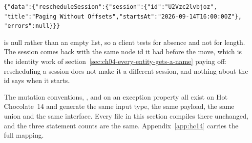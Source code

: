 \begin{verbatim}
{"data":{"rescheduleSession":{"session":{"id":"U2Vzc2lvbjoz",
"title":"Paging Without Offsets","startsAt":"2026-09-14T16:00:00Z"},
"errors":null}}}
\end{verbatim}

 is null rather than an empty list, so a client tests for absence
and not for length. The session comes back with the same node id it had before
the move, which is the identity work of
section~\ref{sec:ch04-every-entity-gets-a-name} paying off: rescheduling a
session does not make it a different session, and nothing about the id says
when it starts.

\begin{onhc14}
The mutation conventions, \code{[MutationType]}, \code{[Error<T>]} and
\code{[ID<T>]} on an exception property all exist on Hot Chocolate~14 and
generate the same input type, the same payload, the same union and the same
 interface. Every file in this section compiles there unchanged,
and the three statement counts are the same.
Appendix~\ref{app:hc14} carries the full mapping.
\end{onhc14}

